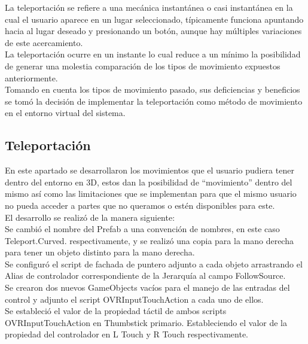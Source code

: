 La teleportación se refiere a una mecánica instantánea o casi instantánea en la cual el usuario aparece en un lugar seleccionado, típicamente funciona apuntando hacia al lugar deseado y presionando un botón, aunque hay múltiples variaciones de este acercamiento.\\

La teleportación ocurre en un instante lo cual reduce a un mínimo la posibilidad de generar una molestia comparación de los tipos de movimiento expuestos anteriormente.\\

Tomando en cuenta los tipos de movimiento pasado, sus deficiencias y beneficios se tomó la decisión de implementar la teleportación como método de movimiento en el entorno virtual del sistema.\\

\subsection{Teleportación}
En este apartado se desarrollaron los movimientos que el usuario pudiera tener dentro del entorno en 3D, estos dan la posibilidad de “movimiento” dentro del mismo así como las limitaciones que se implementan para que el mismo usuario no pueda acceder a partes que no queramos o estén disponibles para este.\\

El desarrollo se realizó de la manera siguiente:\\ 

Se cambió el nombre del Prefab a una convención de nombres, en este caso Teleport.Curved. respectivamente, y se realizó una copia para la mano derecha para tener un objeto distinto para la mano derecha.\\

Se configuró el script de fachada de puntero adjunto a cada objeto arrastrando el Alias de controlador correspondiente de la Jerarquía al campo FollowSource.\\

Se crearon dos nuevos GameObjects vacíos para el manejo de las entradas del control y adjunto el script OVRInputTouchAction a cada uno de ellos.\\

Se estableció el valor de la propiedad táctil de ambos scripts OVRInputTouchAction en Thumbstick primario. Estableciendo el valor de la propiedad del controlador en L Touch y R Touch respectivamente.\\

